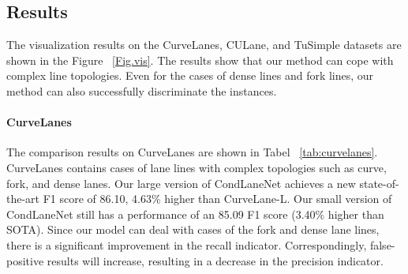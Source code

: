 \documentclass[10pt,twocolumn,letterpaper]{article}
\begin{document}
\subsection{Results}
The visualization results on the CurveLanes, CULane, and TuSimple datasets are shown in the Figure ~\ref{Fig.vis}.
The results show that our method can cope with complex line topologies. Even for the cases of dense lines and fork lines, our method can also successfully discriminate the instances.


\paragraph{CurveLanes}
\begin{table}[h]
\centering
{}
\caption{Comparison of different methods on CurveLanes.}
\label{tab:curvelanes}
\end{table}

The comparison results on CurveLanes are shown in Tabel ~\ref{tab:curvelanes}. CurveLanes contains cases of lane lines with complex topologies such as curve, fork, and dense lanes. Our large version of CondLaneNet achieves a new state-of-the-art F1 score of 86.10, 4.63\% higher than CurveLane-L. Our small version of CondLaneNet still has a performance of an 85.09 F1 score (3.40\% higher than SOTA). Since our model can deal with cases of the fork and dense lane lines, there is a significant improvement in the recall indicator. Correspondingly, false-positive results will increase, resulting in a decrease in the precision indicator.
\end{document}
